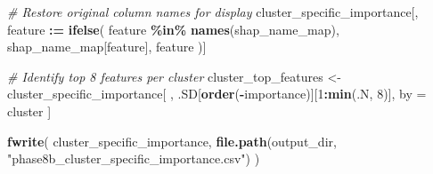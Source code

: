 \documentclass[
]{article}
\newenvironment{Shaded}{\begin{snugshade}}{\end{snugshade}}
\newcommand{\CommentTok}[1]{\textcolor[rgb]{0.56,0.35,0.01}{\textit{#1}}}
\newcommand{\DecValTok}[1]{\textcolor[rgb]{0.00,0.00,0.81}{#1}}
\newcommand{\FunctionTok}[1]{\textcolor[rgb]{0.13,0.29,0.53}{\textbf{#1}}}
\newcommand{\NormalTok}[1]{#1}
\newcommand{\OtherTok}[1]{\textcolor[rgb]{0.56,0.35,0.01}{#1}}
\newcommand{\SpecialCharTok}[1]{\textcolor[rgb]{0.81,0.36,0.00}{\textbf{#1}}}
\newcommand{\StringTok}[1]{\textcolor[rgb]{0.31,0.60,0.02}{#1}}
\begin{document}
\begin{Shaded}
\begin{Highlighting}[]
\CommentTok{\# Restore original column names for display}
\NormalTok{cluster\_specific\_importance[, feature }\SpecialCharTok{:=} \FunctionTok{ifelse}\NormalTok{(}
\NormalTok{  feature }\SpecialCharTok{\%in\%} \FunctionTok{names}\NormalTok{(shap\_name\_map),}
\NormalTok{  shap\_name\_map[feature],}
\NormalTok{  feature}
\NormalTok{)]}

\CommentTok{\# Identify top 8 features per cluster}
\NormalTok{cluster\_top\_features }\OtherTok{\textless{}{-}}\NormalTok{ cluster\_specific\_importance[}
\NormalTok{  , .SD[}\FunctionTok{order}\NormalTok{(}\SpecialCharTok{{-}}\NormalTok{importance)][}\DecValTok{1}\SpecialCharTok{:}\FunctionTok{min}\NormalTok{(.N, }\DecValTok{8}\NormalTok{)],}
\NormalTok{  by }\OtherTok{=}\NormalTok{ cluster}
\NormalTok{]}

\FunctionTok{fwrite}\NormalTok{(}
\NormalTok{  cluster\_specific\_importance,}
  \FunctionTok{file.path}\NormalTok{(output\_dir, }\StringTok{"phase8b\_cluster\_specific\_importance.csv"}\NormalTok{)}
\NormalTok{)}


\end{Highlighting}
\end{Shaded}
\end{document}
